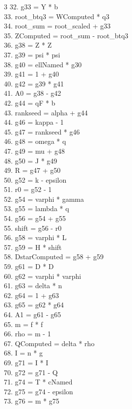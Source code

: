 \documentclass[10pt]{article}
\begin{document}
\begin{multicols}{3}
32. g33 = Y * b\\
33. root\_btq3 = WComputed * q3\\
34. root\_sum = root\_scaled + g33\\
35. ZComputed = root\_sum - root\_btq3\\
36. g38 = Z * Z\\
37. g39 = psi * psi\\
38. g40 = ellNamed * g30\\
39. g41 = 1 + g40\\
40. g42 = g39 * g41\\
41. A0 = g38 - g42\\
42. g44 = qF * b\\
43. rankseed = alpha + g44\\
44. g46 = kappa - 1\\
45. g47 = rankseed * g46\\
46. g48 = omega * q\\
47. g49 = mu + g48\\
48. g50 = J * g49\\
49. R = g47 + g50\\
50. g52 = k - epsilon\\
51. r0 = g52 - 1\\
52. g54 = varphi * gamma\\
53. g55 = lambda * q\\
54. g56 = g54 + g55\\
55. shift = g56 - r0\\
56. g58 = varphi * L\\
57. g59 = H * shift\\
58. DstarComputed = g58 + g59\\
59. g61 = D * D\\
60. g62 = varphi * varphi\\
61. g63 = delta * n\\
62. g64 = 1 + g63\\
63. g65 = g62 * g64\\
64. A1 = g61 - g65\\
65. m = f * f\\
66. rho = m - 1\\
67. QComputed = delta * rho\\
68. I = n * g\\
69. g71 = I * I\\
70. g72 = g71 - Q\\
71. g74 = T * cNamed\\
72. g75 = g74 - epsilon\\
73. g76 = m * g75\\

\end{multicols}
\end{document}
